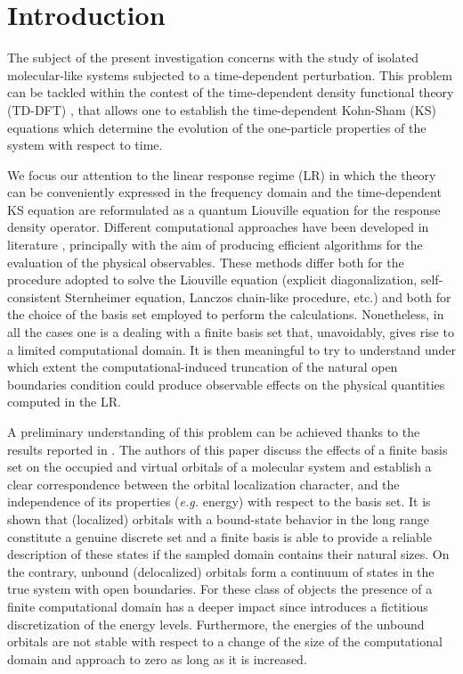 \documentclass[reprint,aps,prb]{revtex4-1}
\begin{document}
\section{Introduction}

The subject of the present investigation concerns with the study of isolated molecular-like systems subjected to a time-dependent perturbation. %
This problem can be tackled within the contest of the time-dependent density functional theory (TD-DFT) \cite{runge1984,onida2002}, that allows one to establish the time-dependent 
Kohn-Sham (KS) equations which determine the evolution of the one-particle properties of the system with respect to time. 

We focus our attention to the linear response regime (LR) in which the theory can be conveniently expressed in the frequency domain and the time-dependent KS equation are reformulated 
as a quantum Liouville equation for the response density operator. Different computational approaches have been developed in literature \cite{baroni2008,hubener2014,brabec2015}, principally 
with the aim of producing efficient algorithms for the evaluation of the physical observables. These methods differ both for the procedure adopted to solve the Liouville equation 
(explicit diagonalization, self-consistent Sternheimer equation, Lanczos chain-like procedure, etc.) and both for the choice of the basis set employed to perform the calculations. 
Nonetheless, in all the cases one is a dealing with a finite basis set that, unavoidably, gives rise to a limited computational domain. 
It is then meaningful to try to understand under 
which extent the computational-induced truncation of the natural open boundaries condition could produce observable effects on the physical quantities computed in the LR. 

A preliminary understanding of this problem can be achieved thanks to the results reported in \cite{boffi2016}. The authors of this paper discuss the effects of a finite basis set on the 
occupied and virtual orbitals of a molecular system and establish a clear correspondence between the orbital localization character, and the independence of its properties (\emph{e.g.} energy) 
with respect to the basis set. It is shown that (localized) orbitals with a bound-state behavior in the long range constitute a genuine discrete set and a finite basis is 
able to provide a reliable description of these states if the sampled domain contains their natural sizes. On the contrary, unbound (delocalized) orbitals form a continuum of states in the 
true system with open boundaries. For these class of objects the presence of a finite computational domain has a deeper impact since introduces a fictitious discretization of the energy levels. 
Furthermore, the energies of the unbound orbitals are not stable with respect to a change of the size of the computational domain and approach to zero as long as it is increased.  
\end{document}
